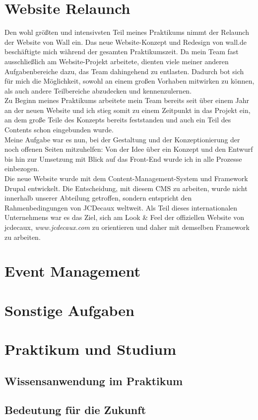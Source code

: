 \section{Website Relaunch}\label{sec:webrelaunch}

Den wohl größten und intensivsten Teil meines Praktikums nimmt der Relaunch der Website von Wall ein. Das neue Website-Konzept und Redesign von wall.de beschäftigte mich während der gesamten Praktikumszeit. Da mein Team fast ausschließlich am Website-Projekt arbeitete, dienten viele meiner anderen Aufgabenbereiche dazu, das Team dahingehend zu entlasten. Dadurch bot sich für mich die Möglichkeit, sowohl an einem großen Vorhaben mitwirken zu können, als auch andere Teilbereiche abzudecken und kennenzulernen. \\ Zu Beginn meines Praktikums arbeitete mein Team bereits seit über einem Jahr an der neuen Website und ich stieg somit zu einem Zeitpunkt in das Projekt ein, an dem große Teile des Konzepts bereits feststanden und auch ein Teil des Contents schon eingebunden wurde. \\ Meine Aufgabe war es nun, bei der Gestaltung und der Konzeptionierung der noch offenen Seiten mitzuhelfen: Von der Idee über ein Konzept und den Entwurf bis hin zur Umsetzung mit Blick auf das Front-End wurde ich in alle Prozesse einbezogen. \\ Die neue Website wurde mit dem Content-Management-System und Framework Drupal entwickelt. Die Entscheidung, mit diesem CMS zu arbeiten, wurde nicht innerhalb unserer Abteilung getroffen, sondern entspricht den Rahmenbedingungen von JCDecaux weltweit. Als Teil dieses internationalen Unternehmens war es das Ziel, sich am Look \& Feel der offiziellen Website von jcdecaux, \textit{www.jcdecaux.com} zu orientieren und daher mit demselben Framework zu arbeiten. 


\section{Event Management}\label{sec:eventmanagement}
\section{Sonstige Aufgaben}\label{sec:sonstiges}
\section{Praktikum und Studium}\label{sec:praktikumstudium}
\subsection{Wissensanwendung im Praktikum}\label{sec:wissensanwendung}
\subsection{Bedeutung für die Zukunft}\label{sec:zukunft}

\newpage
